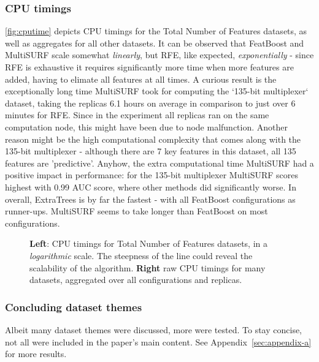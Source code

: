 \documentclass{article}
\begin{document}
\subsubsection{CPU timings}
\autoref{fig:cputime} depicts CPU timings for the Total Number of Features datasets, as well as aggregates for all other datasets. It can be observed that FeatBoost and MultiSURF scale somewhat \textit{linearly}, but RFE, like expected, \textit{exponentially} - since RFE is exhaustive it requires significantly more time when more features are added, having to elimate all features at all times. A curious result is the exceptionally long time MultiSURF took for computing the `135-bit multiplexer` dataset, taking the replicas 6.1 hours on average in comparison to just over 6 minutes for RFE. Since in the experiment all replicas ran on the same computation node, this might have been due to node malfunction. Another reason might be the high computational complexity that comes along with the 135-bit multiplexer - although there are 7 key features in this dataset, all 135 features are 'predictive'. Anyhow, the extra computational time MultiSURF had a positive impact in performance: for the 135-bit multiplexer MultiSURF scores highest with 0.99 AUC score, where other methods did significantly worse. In overall, ExtraTrees is by far the fastest - with all FeatBoost configurations as runner-ups. MultiSURF seems to take longer than FeatBoost on most configurations.

\begin{figure}[ht]
\centering


\caption{\textbf{Left}: CPU timings for Total Number of Features datasets, in a \textit{logarithmic} scale. The steepness of the line could reveal the scalability of the algorithm. \textbf{Right} raw CPU timings for many datasets, aggregated over all configurations and replicas.}
\label{fig:cputime}
\end{figure}

\subsubsection{Concluding dataset themes}
Albeit many dataset themes were discussed, more were tested. To stay concise, not all were included in the paper's main content. See Appendix~\ref{sec:appendix-a} for more results.
\end{document}
